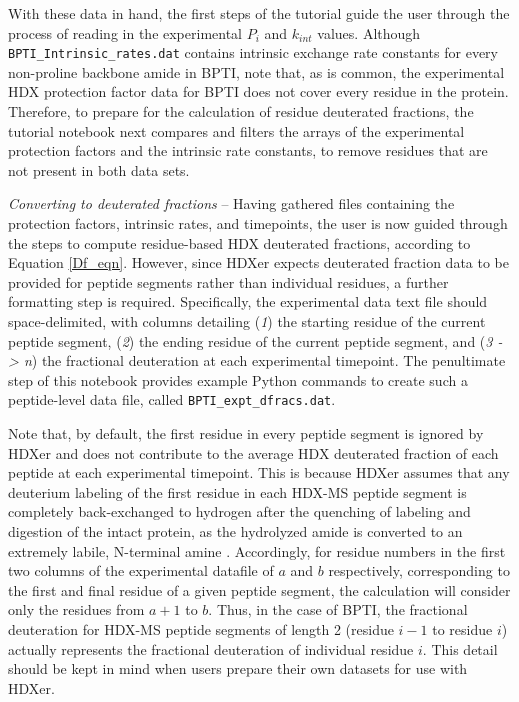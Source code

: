 \documentclass[9pt,tutorial,ASAPversion]{livecoms}
\begin{document}
With these data in hand, the first steps of the tutorial guide the user through the process of reading in the experimental $P_i$ and $k_{int}$ values. 
Although \texttt{BPTI\_Intrinsic\_rates.dat} contains intrinsic exchange rate constants for every non-proline backbone amide in BPTI, note that, as is common, the experimental HDX protection factor data for BPTI does not cover every residue in the protein. 
Therefore, to prepare for the calculation of residue deuterated fractions, the tutorial notebook next compares and filters the arrays of the experimental protection factors and the intrinsic rate constants, to remove residues that are not present in both data sets.

\noindent 
\textit{Converting to deuterated fractions} -- Having gathered files containing the protection factors, intrinsic rates, and timepoints, the user is now guided through the steps to compute residue-based HDX deuterated fractions, according to Equation \ref{Df_eqn}.
However, since HDXer expects deuterated fraction data to be provided for peptide segments rather than individual residues, a further formatting step is required.
Specifically, the experimental data text file should space-delimited, with columns detailing (\textit{1}) the starting residue of the current peptide segment, (\textit{2}) the ending residue of the current peptide segment, and (\textit{3 -> n}) the fractional deuteration at each experimental timepoint.
The penultimate step of this notebook provides example Python commands to create such a peptide-level data file, called \texttt{BPTI\_expt\_dfracs.dat}.

Note that, by default, the first residue in every peptide segment is ignored by HDXer and does not contribute to the average HDX deuterated fraction of each peptide at each experimental timepoint.
This is because HDXer assumes that any deuterium labeling of the first residue in each HDX-MS peptide segment is completely back-exchanged to hydrogen after the quenching of labeling and digestion of the intact protein, as the hydrolyzed amide is converted to an extremely labile, N-terminal amine \cite{Bai1993, Walters2012}.
Accordingly, for residue numbers in the first two columns of the experimental datafile of $a$ and $b$ respectively, corresponding to the first and final residue of a given peptide segment, the calculation will consider only the residues from $a+1$ to $b$.
Thus, in the case of BPTI, the fractional deuteration for HDX-MS peptide segments of length 2 (residue $i-1$ to residue $i$) actually represents the fractional deuteration of individual residue $i$.
This detail should be kept in mind when users prepare their own datasets for use with HDXer.
\end{document}
